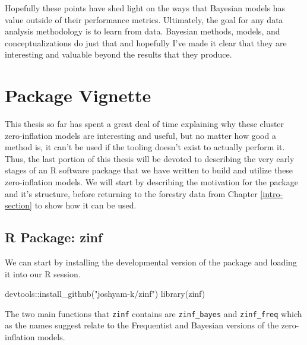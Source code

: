 \documentclass[12pt,twoside]{reedthesis}
\newenvironment{Shaded}{\begin{snugshade}}{\end{snugshade}}
\newcommand{\FunctionTok}[1]{\textcolor[rgb]{0.00,0.00,0.00}{#1}}
\newcommand{\NormalTok}[1]{#1}
\newcommand{\SpecialCharTok}[1]{\textcolor[rgb]{0.00,0.00,0.00}{#1}}
\newcommand{\StringTok}[1]{\textcolor[rgb]{0.31,0.60,0.02}{#1}}
\begin{document}
Hopefully these points have shed light on the ways that Bayesian models has value outside of their performance metrics. Ultimately, the goal for any data analysis methodology is to learn from data. Bayesian methods, models, and conceptualizations do just that and hopefully I've made it clear that they are interesting and valuable beyond the results that they produce.

\hypertarget{vignette}{%
\chapter{Package Vignette}\label{vignette}}

This thesis so far has spent a great deal of time explaining why these cluster zero-inflation models are interesting and useful, but no matter how good a method is, it can't be used if the tooling doesn't exist to actually perform it. Thus, the last portion of this thesis will be devoted to describing the very early stages of an R software package that we have written to build and utilize these zero-inflation models. We will start by describing the motivation for the package and it's structure, before returning to the forestry data from Chapter \ref{intro-section} to show how it can be used.

\hypertarget{r-package-zinf}{%
\section{R Package: zinf}\label{r-package-zinf}}

We can start by installing the developmental version of the package and loading it into our R session.
\begin{Shaded}
\begin{Highlighting}[]
\NormalTok{devtools}\SpecialCharTok{::}\FunctionTok{install\_github}\NormalTok{(}\StringTok{"joshyam{-}k/zinf"}\NormalTok{)}
\FunctionTok{library}\NormalTok{(zinf)}
\end{Highlighting}
\end{Shaded}
The two main functions that \texttt{zinf} contains are \texttt{zinf\_bayes} and \texttt{zinf\_freq} which as the names suggest relate to the Frequentist and Bayesian versions of the zero-inflation models.
\end{document}
